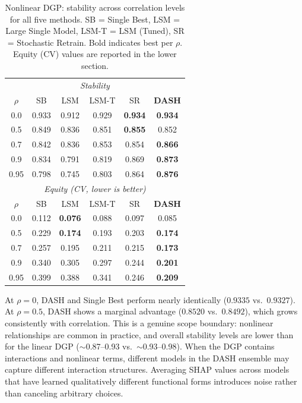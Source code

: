 \documentclass[11pt]{article}
\newcommand{\dash}{\textsc{DASH}}
\newcommand{\rhovar}{\rho}
\begin{document}
\begin{table}[htbp]
\centering
\caption{Nonlinear DGP: stability across correlation levels for all five methods.
SB = Single Best, LSM = Large Single Model, LSM-T = LSM (Tuned),
SR = Stochastic Retrain.
Bold indicates best per $\rhovar$. Equity (CV) values are reported in the lower section.}
\label{tab:nonlinear}
\begin{tabular}{cccccc}
\toprule
\multicolumn{6}{c}{\textit{Stability}} \\
$\rhovar$ & SB & LSM & LSM-T & SR & \textbf{DASH} \\
\midrule
0.0  & 0.933 & 0.912 & 0.929 & \textbf{0.934} & \textbf{0.934} \\
0.5  & 0.849 & 0.836 & 0.851 & \textbf{0.855} & 0.852 \\
0.7  & 0.842 & 0.836 & 0.853 & 0.854 & \textbf{0.866} \\
0.9  & 0.834 & 0.791 & 0.819 & 0.869 & \textbf{0.873} \\
0.95 & 0.798 & 0.745 & 0.803 & 0.864 & \textbf{0.876} \\
\midrule
\multicolumn{6}{c}{\textit{Equity (CV, lower is better)}} \\
$\rhovar$ & SB & LSM & LSM-T & SR & \textbf{DASH} \\
\midrule
0.0  & 0.112 & \textbf{0.076} & 0.088 & 0.097 & 0.085 \\
0.5  & 0.229 & \textbf{0.174} & 0.193 & 0.203 & \textbf{0.174} \\
0.7  & 0.257 & 0.195 & 0.211 & 0.215 & \textbf{0.173} \\
0.9  & 0.340 & 0.305 & 0.297 & 0.244 & \textbf{0.201} \\
0.95 & 0.399 & 0.388 & 0.341 & 0.246 & \textbf{0.209} \\
\bottomrule
\end{tabular}
\end{table}

At $\rhovar = 0$, \dash{} and Single Best perform nearly identically
($0.9335$ vs.\ $0.9327$). At $\rhovar = 0.5$, \dash{} shows a marginal
advantage ($0.8520$ vs.\ $0.8492$), which grows consistently with
correlation. This is a genuine scope boundary: nonlinear relationships
are common in practice, and overall stability levels are lower than for
the linear DGP ($\sim$0.87--0.93 vs.\ $\sim$0.93--0.98). When the DGP
contains interactions and nonlinear terms, different models in the DASH
ensemble may capture different interaction structures. Averaging SHAP
values across models that have learned qualitatively different functional
forms introduces noise rather than canceling arbitrary choices.
\end{document}
